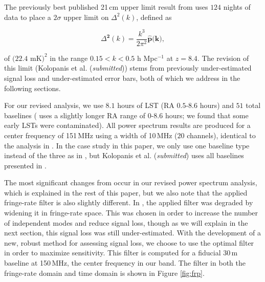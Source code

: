 \documentclass[preprint2,numberedappendix,tighten]{aastex6}  %
\begin{document}
The previously best published 21\,cm upper limit result from  uses $124$ nights of data to place a $2\sigma$ upper limit 
on $\Delta^{2}(k)$, defined as

\begin{equation}
\Delta^{\textbf{2}}(k) = \frac{k^{3}}{2\pi^{2}}\widehat{\textbf{p}}\textbf{(k)},
\end{equation}

\noindent of $(22.4$ mK$)^{2}$ in the range $0.15 < k < 0.5$ h Mpc$^{-1}$ at $z = 8.4$. The revision of this limit (Kolopanis et al. (\textit{submitted})) stems from previously under-estimated signal loss and under-estimated error bars, both of which we 
address in the following sections. 

For our revised analysis, we use $8.1$ hours of LST (RA $0.5$-$8.6$ hours) and $51$ total baselines ( uses a slightly longer RA 
range of $0$-$8.6$ hours; we found that some early LSTs were contaminated). All power spectrum results are produced for a center frequency of 151\,MHz using a width of 10\,MHz ($20$ channels), identical to the analysis in . In the case study in this paper, we only use one baseline type instead of the three as in 
, but Kolopanis et al. (\textit{submitted}) uses all baselines presented in .

The most significant changes from  occur in our revised power spectrum analysis, which is explained in the rest of this paper, but we also note that the applied fringe-rate filter is also slightly different. In , the 
applied filter was degraded by widening it in fringe-rate space. This was chosen in order to increase the number of independent 
modes and reduce signal loss, though as we will explain in the next section, this signal loss was still under-estimated. With the development of a new, 
robust method for assessing signal loss, we choose to use the optimal filter in order to maximize sensitivity. This filter is 
computed for a fiducial 30\,m baseline at 150\,MHz, the center frequency in our band. The filter in both the fringe-rate 
domain and time domain is shown in Figure \ref{fig:frp}.
\end{document}

